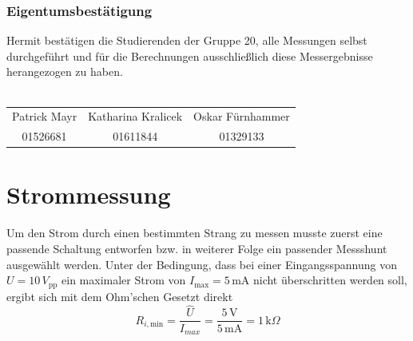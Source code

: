 \subsubsection{Eigentumsbestätigung}
Hermit bestätigen die Studierenden der Gruppe 20, alle Messungen selbst durchgeführt und für die Berechnungen ausschließlich diese Messergebnisse herangezogen zu haben. \\ \\
\begin{tabular*}{\textwidth}{c|c|c}
	Patrick Mayr & Katharina Kralicek & Oskar Fürnhammer \\ 
	01526681 & 01611844 & 01329133 \\ 
\end{tabular*}


\section{Strommessung}
Um den Strom durch einen bestimmten Strang zu messen musste zuerst eine passende Schaltung entworfen bzw. in weiterer Folge ein passender Messshunt ausgewählt werden. Unter der Bedingung, dass bei einer Eingangsspannung von $U=10\,V_{\text{pp}}$ ein maximaler Strom von $I_{\text{max}}=5\,$mA nicht überschritten werden soll, ergibt sich mit dem Ohm'schen Gesetzt direkt
\begin{equation}
	R_{i,\text{min}} = \frac{\hat{U}}{I_{max}} = \frac{5\,\text{V}}{5\,\text{mA}} = 1\,\text{k}\Omega
	\label{eq:widerstandsdim}
\end{equation}
